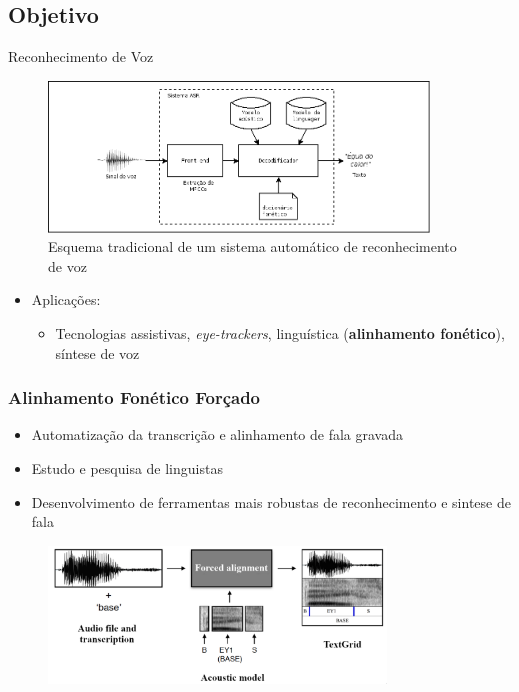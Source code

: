 \subsection{Objetivo}
\begin{frame}{Reconhecimento de Voz}

\begin{figure}
	\includegraphics[width=0.9\textwidth]{Figures/asr}
    \caption{Esquema tradicional de um sistema autom\'atico de reconhecimento de voz}
\end{figure}

\begin{itemize}
    \item Aplica\c c\~oes:
    \begin{itemize}
        \smallskip
		\item Tecnologias assistivas, \textit{eye-trackers}, lingu\'istica (\textbf{alinhamento fon\'etico}), s\'intese de voz
    \end{itemize}
\end{itemize}
\end{frame}


\begin{frame}
\frametitle{Alinhamento Fon\'etico For\c cado}
	\begin{itemize}
		\item Automatiza\c c\~ao  da transcri\c c\~ao e alinhamento de fala gravada
		\item Estudo e pesquisa de linguistas
		\item Desenvolvimento de ferramentas mais robustas de reconhecimento e sintese de fala
	\end{itemize}
	\begin{figure}
	\begin{center}
		\includegraphics[width=0.8\textwidth]{Figures/align}
	\end{center}
	\end{figure}


\end{frame}


